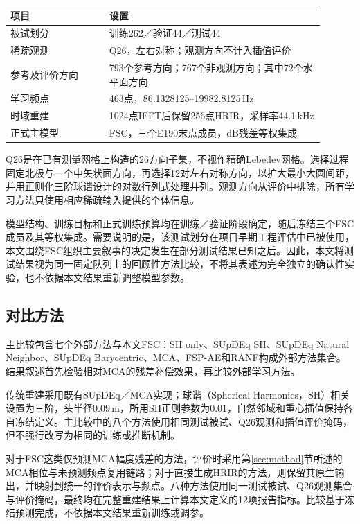 \documentclass[UTF8,a4paper]{article}
\begin{document}
\begin{table}[htbp]
\centering\small
{}
\begin{tabular}{p{0.29\linewidth}p{0.61\linewidth}}
\toprule
项目 & 设置\\
\midrule
被试划分 & 训练262／验证44／测试44\\
稀疏观测 & Q26，左右对称；观测方向不计入插值评价\\
参考及评价方向 & 793个参考方向；767个非观测方向；其中72个水平面方向\\
学习频点 & 463点，86.1328125--19982.8125\,Hz\\
时域重建 & 1024点IFFT后保留256点HRIR，采样率44.1\,kHz\\
正式主模型 & FSC，三个E190末点成员，dB残差等权集成\\
\bottomrule
\end{tabular}
\end{table}

Q26是在已有测量网格上构造的26方向子集，不视作精确Lebedev网格。选择过程固定北极与一个中矢状面方向，再选择12对左右对称方向，以扩大最小大圆间距，并用正则化三阶球谐设计的对数行列式处理并列。观测方向从评价中排除，所有学习方法只使用相应稀疏输入提供的个体信息。

模型结构、训练目标和正式训练预算均在训练／验证阶段确定，随后冻结三个FSC成员及其等权集成。需要说明的是，该测试划分在项目早期工程评估中已被使用，本文围绕FSC组织主要叙事的决定发生在部分测试结果已知之后。因此，本文将测试结果视为同一固定队列上的回顾性方法比较，不将其表述为完全独立的确认性实验，也不依据本文结果重新调整模型参数。

\subsection{对比方法}
主比较包含七个外部方法与本文FSC：SH only、SUpDEq SH、SUpDEq Natural Neighbor、SUpDEq Barycentric、MCA、FSP-AE和RANF构成外部方法集合。结果叙述首先检验相对MCA的残差补偿效果，再比较外部学习方法。

传统重建采用既有SUpDEq／MCA实现；球谐（Spherical Harmonics，SH）相关设置为三阶，头半径0.09\,m，所用SH正则参数为0.01，自然邻域和重心插值保持各自冻结定义。主比较中的八个方法使用相同测试被试、Q26观测和插值评价掩码，但不强行改写为相同的训练或推断机制。

对于FSC这类仅预测MCA幅度残差的方法，评价时采用第\ref{sec:method}节所述的MCA相位与未预测频点复用链路；对于直接生成HRIR的方法，则保留其原生输出，并映射到统一的评价表示与频点。八种方法使用同一测试被试、Q26观测集合与评价掩码，最终均在完整重建结果上计算本文定义的12项报告指标。比较基于冻结预测完成，不依据本文结果重新训练或调参。
\end{document}
